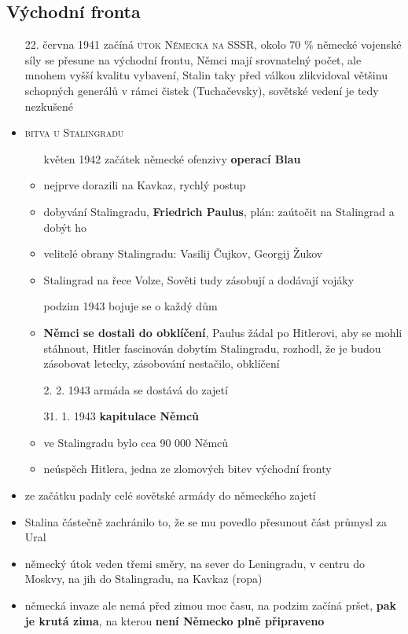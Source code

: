 \documentclass{article}
\begin{document}
\subsection*{Východní fronta}
\begin{itemize}
    \item[22. června 1941] začíná \textsc{útok Německa na SSSR}, okolo 70 \% německé vojenské síly se přesune na východní frontu, Němci mají srovnatelný počet, ale mnohem vyšší kvalitu vybavení, Stalin taky před válkou zlikvidoval většinu schopných generálů v rámci čistek (Tuchačevsky), sovětské vedení je tedy nezkušené
    \item \textsc{bitva u Stalingradu}
    \begin{itemize}
      \item[květen 1942] začátek německé ofenzivy \textbf{operací Blau}
      \item nejprve dorazili na Kavkaz, rychlý postup
      \item dobyvání Stalingradu, \textbf{Friedrich Paulus}, plán: zaútočit na Stalingrad a dobýt ho
      \item velitelé obrany Stalingradu: Vasilij Čujkov, Georgij Žukov
      \item Stalingrad na řece Volze, Sověti tudy zásobují a dodávají vojáky
      \item[podzim 1943] bojuje se o každý dům
      \item \textbf{Němci se dostali do obklíčení}, Paulus žádal po Hitlerovi, aby se mohli stáhnout, Hitler fascinován dobytím Stalingradu, rozhodl, že je budou zásobovat letecky, zásobování nestačilo, obklíčení
      \item[2. 2. 1943] armáda se dostává do zajetí
      \item [31. 1. 1943] \textbf{kapitulace Němců}
      \item ve Stalingradu bylo cca 90 000 Němců
      \item neúspěch Hitlera, jedna ze zlomových bitev východní fronty
    \end{itemize}
    \item ze začátku padaly celé sovětské armády do německého zajetí
    \item Stalina částečně zachránilo to, že se mu povedlo přesunout část průmysl za Ural
    \item německý útok veden třemi směry, na sever do Leningradu, v centru do Moskvy, na jih do Stalingradu, na Kavkaz (ropa)
    \item německá invaze ale nemá před zimou moc času, na podzim začíná pršet, \textbf{pak je krutá zima}, na kterou \textbf{není Německo plně připraveno}

\end{itemize}
\end{document}
